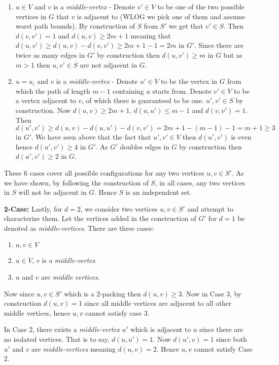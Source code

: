 \documentclass[10pt, a4paper]{article}
\theoremstyle{definition}
\begin{document}
\begin{enumerate}
	\item $u \in V$ and $v$ is a \emph{middle-vertex} - Denote $v' \in V$ to be one of the two possible vertices in $G$ that $v$ is adjacent to (WLOG we pick one of them and assume worst path bounds). By construction of $S$ from $S'$ we get that $v' \in S$. Then $d(v,v') = 1$ and $d(u,v) \geq 2m+1$ meaning that $d(u,v') \geq d(u,v) - d(v,v') \geq 2m + 1 -1 = 2m$ in $G'$. Since there are twice as many edges in $G'$ by construction then $d(u,v') \geq m$ in $G$ but as $m > 1$ then $u,v' \in S$ are not adjacent in $G$.  

	\item $u = u_i$ and $v$ is a \emph{middle-vertex} - Denote $u' \in V$ to be the vertex in $G$ from which the path of length $m-1$ containing $u$ starts from. Denote $v' \in V$ to be a vertex adjacent to $v$, of which there is guaranteed to be one. $u',v' \in S$ by construction. Now $d(u,v) \geq 2m+1$, $d(u,u') \leq m-1$ and $d(v,v') = 1$. Then $d(u',v') \geq d(u,v) - d(u,u') - d(v,v') = 2m+1 - (m-1) - 1 = m + 1 \geq 3$ in $G'$. We have seen above that the fact that $u',v' \in V$ then $d(u',v')$ is even hence $d(u',v') \geq 4$ in $G'$. As $G'$ doubles edges in $G$ by construction then $d(u',v') \geq 2$ in $G$.
\end{enumerate}

These 6 cases cover all possible configurations for any two vertices $u,v \in S'$. As we have shown, by following the construction of $S$, in all cases, any two vertices in $S$ will not be adjacent in $G$. Hence $S$ is an independent set.

\textbf{2-Case:} Lastly, for $d = 2$, we consider two vertices $u,v \in S'$ and attempt to characterize them. Let the vertices added in the construction of $G'$ for $d = 1$ be denoted as \emph{middle-vertices}. There are three cases:

\begin{enumerate}
	\item $u,v \in V$
	\item $u \in V$, $v$ is a \emph{middle-vertex}
	\item $u$ and $v$ are \emph{middle vertices}.
\end{enumerate}

Now since $u,v \in S'$ which is a 2-packing then $d(u,v) \geq 3$. Now in Case 3, by construction $d(u,v) = 1$ since all middle vertices are adjacent to all other middle vertices, hence $u,v$ cannot satisfy case 3. 

In Case 2, there exists a \emph{middle-vertex} $u'$ which is adjacent to $u$ since there are no isolated vertices. That is to say, $d(u,u') = 1$. Now $d(u',v) = 1$ since both $u'$ and $v$ are \emph{middle-vertices} meaning $d(u,v) = 2$. Hence $u,v$ cannot satisfy Case 2.
\end{document}
